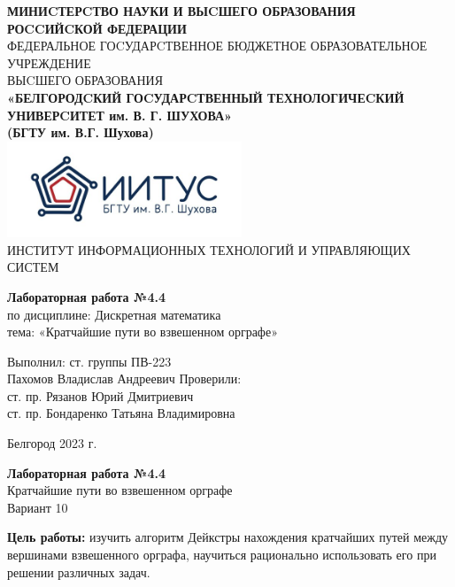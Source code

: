 \documentclass[a4paper,14pt]{extarticle}
\newcommand\textbox[1]{
	\parbox{.45\textwidth}{#1}
}
\begin{document}
\begin{center}
    \small{
        \textbf{МИНИCТЕРCТВО НАУКИ И ВЫCШЕГО ОБРАЗОВАНИЯ РОCCИЙCКОЙ ФЕДЕРАЦИИ}\\
        ФЕДЕРАЛЬНОЕ ГОCУДАРCТВЕННОЕ БЮДЖЕТНОЕ ОБРАЗОВАТЕЛЬНОЕ УЧРЕЖДЕНИЕ\\ВЫCШЕГО ОБРАЗОВАНИЯ \\
        \textbf{«БЕЛГОРОДCКИЙ ГОCУДАРCТВЕННЫЙ ТЕХНОЛОГИЧЕCКИЙ\\УНИВЕРCИТЕТ им. В. Г. ШУХОВА»\\ (БГТУ им. В.Г. Шухова)} \\
        \bigbreak
        \includegraphics[width=70mm]{log}\\
        ИНСТИТУТ ИНФОРМАЦИОННЫХ ТЕХНОЛОГИЙ И УПРАВЛЯЮЩИХ СИСТЕМ\\}
\end{center}

\vfill
\begin{center}
    \large{
        \textbf{
            Лабораторная работа №4.4}}\\
    \normalsize{
        по дисциплине: Дискретная математика \\
        тема: «Кратчайшие пути во взвешенном орграфе»}
\end{center}
\vfill
\hfill\textbox{
    Выполнил: ст. группы ПВ-223\\Пахомов Владислав Андреевич
    \bigbreak
    Проверили: \\ст. пр. Рязанов Юрий Дмитриевич\\
    ст. пр. Бондаренко Татьяна Владимировна
}
\vfill\begin{center}
    Белгород 2023 г.
\end{center}
\newpage
\begin{center}
    \textbf{Лабораторная работа №4.4}\\
    Кратчайшие пути во взвешенном орграфе\\
    Вариант 10
\end{center}
\textbf{Цель работы: }изучить алгоритм Дейкстры нахождения кратчайших путей между вершинами взвешенного орграфа,
научиться рационально использовать его при решении различных задач.
\end{document}
